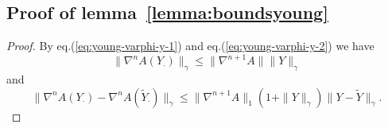 \documentclass[a4paper,12pt,reqno]{amsart}
\newcommand{\wt}{\widetilde}
\begin{document}
\subsection{Proof of lemma~\ref{lemma:boundsyoung}}
\label{sec:proof-bounds-young}
\begin{proof}
By eq.(\ref{eq:young-varphi-y-1}) and eq.(\ref{eq:young-varphi-y-2}) we have
\begin{equation}
\label{eq:bounda}
  \|\nabla^n A(Y_\cdot)\|_{\gamma} \le  \|\nabla^{n+1} A\| \|Y\|_{\gamma}
\end{equation}
and
\begin{equation}
\label{eq:boundadiff}
  \|\nabla^n A(Y_\cdot)-\nabla^n A(\wt Y_\cdot)\|_{\gamma} \le
  \|\nabla^{n+1} A\|_1 (1+
 \| Y\|_{\gamma})   \|Y - \wt Y\|_{\gamma}.
\end{equation}



\end{proof}
\end{document}
